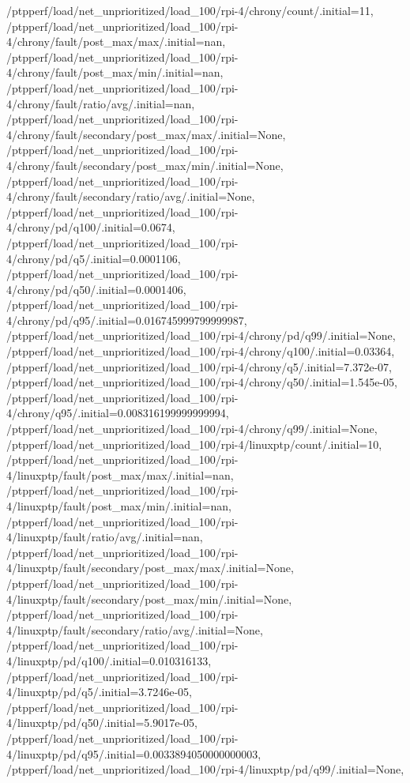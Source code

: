 {    /ptpperf/load/net_unprioritized/load_100/rpi-4/chrony/count/.initial=11,
    /ptpperf/load/net_unprioritized/load_100/rpi-4/chrony/fault/post_max/max/.initial=nan,
    /ptpperf/load/net_unprioritized/load_100/rpi-4/chrony/fault/post_max/min/.initial=nan,
    /ptpperf/load/net_unprioritized/load_100/rpi-4/chrony/fault/ratio/avg/.initial=nan,
    /ptpperf/load/net_unprioritized/load_100/rpi-4/chrony/fault/secondary/post_max/max/.initial=None,
    /ptpperf/load/net_unprioritized/load_100/rpi-4/chrony/fault/secondary/post_max/min/.initial=None,
    /ptpperf/load/net_unprioritized/load_100/rpi-4/chrony/fault/secondary/ratio/avg/.initial=None,
    /ptpperf/load/net_unprioritized/load_100/rpi-4/chrony/pd/q100/.initial=0.0674,
    /ptpperf/load/net_unprioritized/load_100/rpi-4/chrony/pd/q5/.initial=0.0001106,
    /ptpperf/load/net_unprioritized/load_100/rpi-4/chrony/pd/q50/.initial=0.0001406,
    /ptpperf/load/net_unprioritized/load_100/rpi-4/chrony/pd/q95/.initial=0.016745999799999987,
    /ptpperf/load/net_unprioritized/load_100/rpi-4/chrony/pd/q99/.initial=None,
    /ptpperf/load/net_unprioritized/load_100/rpi-4/chrony/q100/.initial=0.03364,
    /ptpperf/load/net_unprioritized/load_100/rpi-4/chrony/q5/.initial=7.372e-07,
    /ptpperf/load/net_unprioritized/load_100/rpi-4/chrony/q50/.initial=1.545e-05,
    /ptpperf/load/net_unprioritized/load_100/rpi-4/chrony/q95/.initial=0.008316199999999994,
    /ptpperf/load/net_unprioritized/load_100/rpi-4/chrony/q99/.initial=None,
    /ptpperf/load/net_unprioritized/load_100/rpi-4/linuxptp/count/.initial=10,
    /ptpperf/load/net_unprioritized/load_100/rpi-4/linuxptp/fault/post_max/max/.initial=nan,
    /ptpperf/load/net_unprioritized/load_100/rpi-4/linuxptp/fault/post_max/min/.initial=nan,
    /ptpperf/load/net_unprioritized/load_100/rpi-4/linuxptp/fault/ratio/avg/.initial=nan,
    /ptpperf/load/net_unprioritized/load_100/rpi-4/linuxptp/fault/secondary/post_max/max/.initial=None,
    /ptpperf/load/net_unprioritized/load_100/rpi-4/linuxptp/fault/secondary/post_max/min/.initial=None,
    /ptpperf/load/net_unprioritized/load_100/rpi-4/linuxptp/fault/secondary/ratio/avg/.initial=None,
    /ptpperf/load/net_unprioritized/load_100/rpi-4/linuxptp/pd/q100/.initial=0.010316133,
    /ptpperf/load/net_unprioritized/load_100/rpi-4/linuxptp/pd/q5/.initial=3.7246e-05,
    /ptpperf/load/net_unprioritized/load_100/rpi-4/linuxptp/pd/q50/.initial=5.9017e-05,
    /ptpperf/load/net_unprioritized/load_100/rpi-4/linuxptp/pd/q95/.initial=0.0033894050000000003,
    /ptpperf/load/net_unprioritized/load_100/rpi-4/linuxptp/pd/q99/.initial=None,
}
